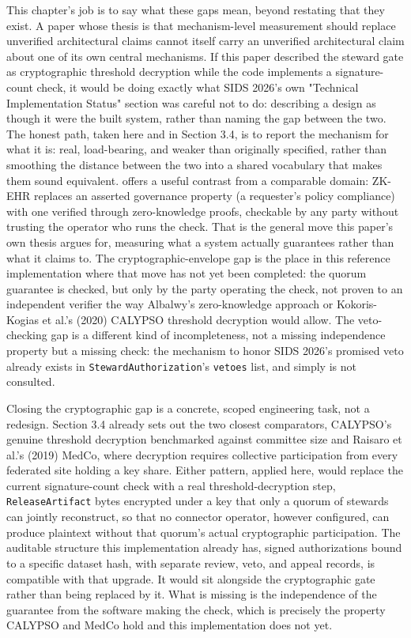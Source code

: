 This chapter's job is to say what these gaps mean, beyond restating that they exist. A paper whose thesis is that mechanism-level measurement should replace unverified architectural claims cannot itself carry an unverified architectural claim about one of its own central mechanisms. If this paper described the steward gate as cryptographic threshold decryption while the code implements a signature-count check, it would be doing exactly what SIDS 2026's own "Technical Implementation Status" section was careful not to do: describing a design as though it were the built system, rather than naming the gap between the two. The honest path, taken here and in Section 3.4, is to report the mechanism for what it is: real, load-bearing, and weaker than originally specified, rather than smoothing the distance between the two into a shared vocabulary that makes them sound equivalent. \cite{albalwy2026} offers a useful contrast from a comparable domain: ZK-EHR replaces an asserted governance property (a requester's policy compliance) with one verified through zero-knowledge proofs, checkable by any party without trusting the operator who runs the check. That is the general move this paper's own thesis argues for, measuring what a system actually guarantees rather than what it claims to. The cryptographic-envelope gap is the place in this reference implementation where that move has not yet been completed: the quorum guarantee is checked, but only by the party operating the check, not proven to an independent verifier the way Albalwy's zero-knowledge approach or Kokoris-Kogias et al.'s (2020) CALYPSO threshold decryption would allow. The veto-checking gap is a different kind of incompleteness, not a missing independence property but a missing check: the mechanism to honor SIDS 2026's promised veto already exists in \texttt{StewardAuthorization}'s \texttt{vetoes} list, and simply is not consulted.

Closing the cryptographic gap is a concrete, scoped engineering task, not a redesign. Section 3.4 already sets out the two closest comparators, CALYPSO's genuine threshold decryption benchmarked against committee size and Raisaro et al.'s (2019) MedCo, where decryption requires collective participation from every federated site holding a key share. Either pattern, applied here, would replace the current signature-count check with a real threshold-decryption step, \texttt{ReleaseArtifact} bytes encrypted under a key that only a quorum of stewards can jointly reconstruct, so that no connector operator, however configured, can produce plaintext without that quorum's actual cryptographic participation. The auditable structure this implementation already has, signed authorizations bound to a specific dataset hash, with separate review, veto, and appeal records, is compatible with that upgrade. It would sit alongside the cryptographic gate rather than being replaced by it. What is missing is the independence of the guarantee from the software making the check, which is precisely the property CALYPSO and MedCo hold and this implementation does not yet.

